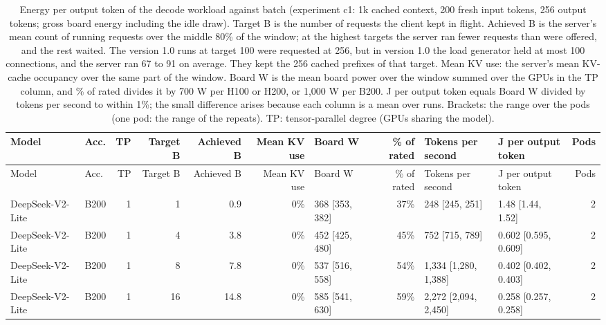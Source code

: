 \begin{landscape}
\begingroup
\scriptsize
\setlength{\tabcolsep}{3pt}
\begin{longtable}{llrrrrlrllr}
\caption{Energy per output token of the decode workload against batch (experiment c1: 1k cached context, 200 fresh input tokens, 256 output tokens; gross board energy including the idle draw). Target B is the number of requests the client kept in flight. Achieved B is the server's mean count of running requests over the middle 80\% of the window; at the highest targets the server ran fewer requests than were offered, and the rest waited. The version 1.0 runs at target 100 were requested at 256, but in version 1.0 the load generator held at most 100 connections, and the server ran 67 to 91 on average. They kept the 256 cached prefixes of that target. Mean KV use: the server's mean KV-cache occupancy over the same part of the window. Board W is the mean board power over the window summed over the GPUs in the TP column, and \% of rated divides it by 700 W per H100 or H200, or 1,000 W per B200. J per output token equals Board W divided by tokens per second to within 1\%; the small difference arises because each column is a mean over runs. Brackets: the range over the pods (one pod: the range of the repeats). TP: tensor-parallel degree (GPUs sharing the model).}\label{tab:decode_batch}\\
\toprule
Model & Acc. & TP & Target B & Achieved B & Mean KV use & Board W & \% of rated & \makecell[l]{Tokens per\\second} & \makecell[l]{J per output\\token} & Pods \\
\midrule
\endfirsthead
\toprule
Model & Acc. & TP & Target B & Achieved B & Mean KV use & Board W & \% of rated & \makecell[l]{Tokens per\\second} & \makecell[l]{J per output\\token} & Pods \\
\midrule
\endhead
\bottomrule
\endfoot
DeepSeek-V2-Lite & B200 & 1 & 1 & 0.9 & 0\% & 368 {[}353, 382{]} & 37\% & 248 {[}245, 251{]} & 1.48 {[}1.44, 1.52{]} & 2 \\
DeepSeek-V2-Lite & B200 & 1 & 4 & 3.8 & 0\% & 452 {[}425, 480{]} & 45\% & 752 {[}715, 789{]} & 0.602 {[}0.595, 0.609{]} & 2 \\
DeepSeek-V2-Lite & B200 & 1 & 8 & 7.8 & 0\% & 537 {[}516, 558{]} & 54\% & 1,334 {[}1,280, 1,388{]} & 0.402 {[}0.402, 0.403{]} & 2 \\
DeepSeek-V2-Lite & B200 & 1 & 16 & 14.8 & 0\% & 585 {[}541, 630{]} & 59\% & 2,272 {[}2,094, 2,450{]} & 0.258 {[}0.257, 0.258{]} & 2 \\

\end{longtable}
\end{landscape}
